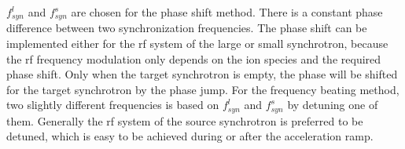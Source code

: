 %
$f_{\mathit{syn}}^{l}$ and $f_{\mathit{syn}}^{s}$ are chosen for the phase shift method. There is a constant phase difference between two synchronization frequencies. The phase shift can be implemented either for the rf system of the large or small synchrotron, because the rf frequency modulation only depends on the ion species and the required phase shift. Only when the target synchrotron is empty, the phase will be shifted for the target synchrotron by the phase jump. For the frequency beating method, two slightly different frequencies is based on $f_{\mathit{syn}}^{l}$ and $f_{\mathit{syn}}^{s}$ by detuning one of them. Generally the rf system of the source synchrotron is preferred to be detuned, which is easy to be achieved during or after the acceleration ramp. 


